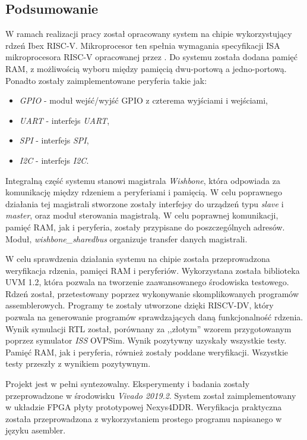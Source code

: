 \documentclass[11pt,a4paper]{article}
\begin{document}
	\subsection{Podsumowanie}
		\hspace{5mm} W ramach realizacji pracy został opracowany system na chipie wykorzystujący rdzeń Ibex RISC-V. Mikroprocesor ten spełnia wymagania specyfikacji ISA mikroprocesora RISC-V opracowanej przez . Do systemu została dodana pamięć RAM, z możliwością wyboru między pamięcią dwu-portową a jedno-portową. Ponadto zostały zaimplementowane peryferia takie jak:
	\begin{itemize}
		\item \textit{GPIO} - moduł wejść/wyjść GPIO z czterema wyjściami i wejściami,
		\item \textit{UART} - interfejs \textit{UART},
		\item \textit{SPI} - interfejs \textit{SPI},
		\item \textit{I2C} - interfejs \textit{I2C}.
	\end{itemize}

Integralną część systemu stanowi magistrala \textit{Wishbone}, która odpowiada za komunikację między rdzeniem a peryferiami i pamięcią. W celu poprawnego działania tej magistrali stworzone zostały interfejsy do urządzeń typu \textit{slave} i \textit{master}, oraz moduł sterowania magistralą. W celu poprawnej komunikacji, pamięć RAM, jak i peryferia, zostały przypisane do poszczególnych adresów. Moduł‚ \textit{wishbone\_sharedbus} organizuje transfer danych magistrali.

W celu sprawdzenia działania systemu na chipie została przeprowadzona weryfikacja rdzenia, pamięci RAM i peryferiów. Wykorzystana została biblioteka UVM 1.2, która pozwala na tworzenie zaawansowanego środowiska testowego. Rdzeń został‚ przetestowany poprzez wykonywanie skomplikowanych programów assemblerowych. Programy te zostały utworzone dzięki RISCV-DV, który pozwala na generowanie programów sprawdzających daną funkcjonalność rdzenia. Wynik symulacji RTL został‚ porównany za ,,złotym'' wzorem przygotowanym poprzez symulator \textit{ISS} OVPSim. Wynik pozytywny uzyskały wszystkie testy. Pamięć RAM, jak i peryferia, również zostały poddane weryfikacji. Wszystkie testy przeszły z wynikiem pozytywnym.

Projekt jest w pełni syntezowalny. Eksperymenty i badania zostały przeprowadzone w środowisku \textit{Vivado 2019.2}. System został zaimplementowany w układzie FPGA płyty prototypowej Nexys4DDR. Weryfikacja praktyczna została przeprowadzona z wykorzystaniem prostego programu napisanego w języku asembler.
\end{document}
